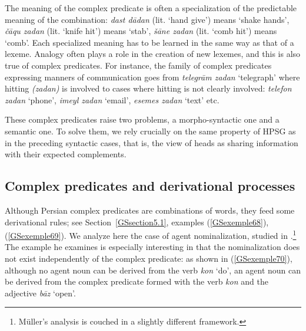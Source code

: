 \documentclass[output=paper
                ,modfonts
                ,nonflat
	        ,collection
	        ,collectionchapter
	        ,collectiontoclongg
 	        ,biblatex
                ,babelshorthands
                ,newtxmath
                ,draftmode
                ,colorlinks, citecolor=brown
]{./langsci/langscibook}
\begin{document}
{\eal
	\label{GSexemple69} 
	\label{GSexemple69a}
		
	\label{GSexemple69b}
\zl

The meaning of the complex predicate is often a specialization of the predictable meaning of the combination: \emph{dast d\=adan} (lit. `hand give') means `shake hands', \emph{\v c\=aqu zadan} (lit. `knife hit') means `stab', \emph{\v s\=ane zadan} (lit. `comb hit') means `comb'. Each specialized meaning has to be learned in the same way as that of a lexeme. Analogy often plays a role in the creation of new lexemes, and this is also true of complex predicates. For instance, the family of complex predicates expressing manners of communication goes from \emph{telegr\=am zadan} `telegraph' where hitting \emph{(zadan)} is involved to cases where hitting is not clearly involved: \emph{telefon zadan} `phone’, \emph{imeyl zadan} `email', \emph{esemes zadan} `text' etc.   

These complex predicates raise two problems, a morpho-syntactic one and a semantic one. To solve them, we rely crucially on the same property of HPSG as in the preceding syntactic cases, that is, the view of heads as sharing information with their expected complements. 

\subsection{Complex predicates and derivational processes}\label{GSsection5.2}

Although Persian complex predicates are combinations of words, they feed some derivational rules; see Section~\ref{GSsection5.1}, examples (\ref{GSexemple68}), (\ref{GSexemple69}). We analyze here the case of agent nominalization, studied in \cite{MuellerPersian-unlinked}.\footnote{Müller’s analysis is couched in a slightly different framework.} The example he examines is especially interesting in that the nominalization does not exist independently of the complex predicate: as shown in (\ref{GSexemple70}), although no agent noun can be derived from the verb \emph{kon} `do', an agent noun can be derived from the complex predicate formed with the verb \emph{kon} and the adjective \emph{b\=az} `open'.


}
\end{document}
